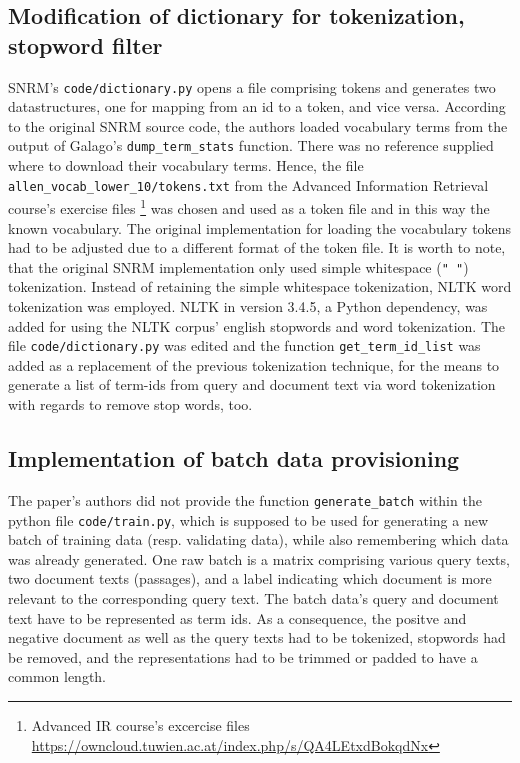 \subsection{Modification of dictionary for tokenization, stopword filter}
SNRM's \texttt{code/dictionary.py} opens a file comprising tokens and generates two datastructures, one for mapping 
    from an id to a token, and vice versa.
According to the original SNRM source code, the authors loaded vocabulary terms from the output of 
    Galago's \verb|dump_term_stats| function.
There was no reference supplied where to download their vocabulary terms.
Hence, the file \verb|allen_vocab_lower_10/tokens.txt| from the Advanced Information Retrieval course's exercise files 
    \footnote{Advanced IR course's excercise files \url{https://owncloud.tuwien.ac.at/index.php/s/QA4LEtxdBokqdNx}}
    was chosen and used as a token file and in this way the known vocabulary.
The original implementation for loading the vocabulary tokens had to be adjusted due to a different format of the token file.
It is worth to note, that the original SNRM implementation only used simple whitespace (\verb|" "|) tokenization.
Instead of retaining the simple whitespace tokenization, NLTK word tokenization was employed.
NLTK in version 3.4.5, a Python dependency, was added for using the NLTK corpus' english stopwords and word tokenization.
The file \texttt{code/dictionary.py} was edited and the function \verb|get_term_id_list| was added as a 
    replacement of the previous tokenization technique, for the means to generate a list of term-ids from 
    query and document text via word tokenization with regards to remove stop words, too.

\subsection{Implementation of batch data provisioning}
The paper's authors did not provide the function \verb|generate_batch| within the python file \verb|code/train.py|, 
    which is supposed to be used for generating a new batch of training data (resp. validating data), while 
    also remembering which data was already generated.
One raw batch is a matrix comprising various query texts, two document texts (passages), and a label indicating which document 
    is more relevant to the corresponding query text.
The batch data's query and document text have to be represented as term ids. 
As a consequence, the positve and negative document as well as the query texts had to be tokenized, stopwords had be removed,
    and the representations had to be trimmed or padded to have a common length.


